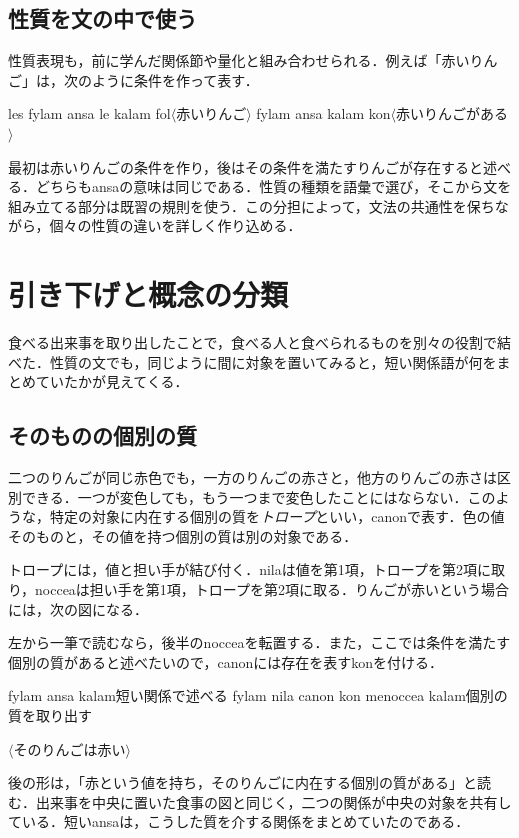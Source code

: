 \documentclass[b5paper, 10pt]{ltjsarticle}
\newcommand{\ko}[1]{\textsf{#1}}
\newcommand{\sentence}[1]{$\langle$#1$\rangle$}
\begin{document}
\subsection{性質を文の中で使う}
性質表現も，前に学んだ関係節や量化と組み合わせられる．例えば「赤いりんご」は，次のように条件を作って表す．
\begin{exe}
    \ex \ko{les fylam ansa le kalam fol}\hfill \sentence{赤いりんご}
    \ex \ko{fylam ansa kalam kon}\hfill \sentence{赤いりんごがある}
\end{exe}
最初は赤いりんごの条件を作り，後はその条件を満たすりんごが存在すると述べる．どちらも\ko{ansa}の意味は同じである．性質の種類を語彙で選び，そこから文を組み立てる部分は既習の規則を使う．この分担によって，文法の共通性を保ちながら，個々の性質の違いを詳しく作り込める．

\section{引き下げと概念の分類}
食べる出来事を取り出したことで，食べる人と食べられるものを別々の役割で結べた．性質の文でも，同じように間に対象を置いてみると，短い関係語が何をまとめていたかが見えてくる．

\subsection{そのものの個別の質}
二つのりんごが同じ赤色でも，一方のりんごの赤さと，他方のりんごの赤さは区別できる．一つが変色しても，もう一つまで変色したことにはならない．このような，特定の対象に内在する個別の質を\emph{トロープ}といい，\ko{canon}で表す．色の値そのものと，その値を持つ個別の質は別の対象である．

トロープには，値と担い手が結び付く．\ko{nila}は値を第1項，トロープを第2項に取り，\ko{noccea}は担い手を第1項，トロープを第2項に取る．りんごが赤いという場合には，次の図になる．
\begin{center}
\end{center}
左から一筆で読むなら，後半の\ko{noccea}を転置する．また，ここでは条件を満たす個別の質があると述べたいので，\ko{canon}には存在を表す\ko{kon}を付ける．
\begin{exe}
    \ex\begin{xlist}
        \ex \ko{fylam ansa kalam}\hfill 短い関係で述べる
        \ex \ko{fylam nila canon kon menoccea kalam}\hfill 個別の質を取り出す
    \end{xlist}
    \glt \sentence{そのりんごは赤い}
\end{exe}
後の形は，「赤という値を持ち，そのりんごに内在する個別の質がある」と読む．出来事を中央に置いた食事の図と同じく，二つの関係が中央の対象を共有している．短い\ko{ansa}は，こうした質を介する関係をまとめていたのである．
\end{document}
